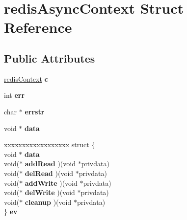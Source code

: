 \hypertarget{structredis_async_context}{}\section{redis\+Async\+Context Struct Reference}
\label{structredis_async_context}
\subsection*{Public Attributes}
\begin{DoxyCompactItemize}
\item 
\mbox{\label{structredis_async_context_a3c1096341a3041b295c612269394f01b}} 
\mbox{\hyperlink{structredis_context}{redis\+Context}} {\bfseries c}
\item 
\mbox{\label{structredis_async_context_a0031ee5988e9a7e827dd1f15baad1d60}} 
int {\bfseries err}
\item 
\mbox{\label{structredis_async_context_ac8b7a551b88583b36e943a717d4244fc}} 
char $\ast$ {\bfseries errstr}
\item 
\mbox{\label{structredis_async_context_a11524847be44957259ec5f8a6c73e832}} 
void $\ast$ {\bfseries data}
\item 
\mbox{\label{structredis_async_context_af44bb2fe80c05bad638d1030ae7c3974}} 
\begin{tabbing}
xx\=xx\=xx\=xx\=xx\=xx\=xx\=xx\=xx\=\kill
struct \{\\
\>void $\ast$ {\bfseries data}\\
\>void($\ast$ {\bfseries addRead} )(void $\ast$privdata)\\
\>void($\ast$ {\bfseries delRead} )(void $\ast$privdata)\\
\>void($\ast$ {\bfseries addWrite} )(void $\ast$privdata)\\
\>void($\ast$ {\bfseries delWrite} )(void $\ast$privdata)\\
\>void($\ast$ {\bfseries cleanup} )(void $\ast$privdata)\\
\} {\bfseries ev}\\


\end{tabbing}
\end{DoxyCompactItemize}
